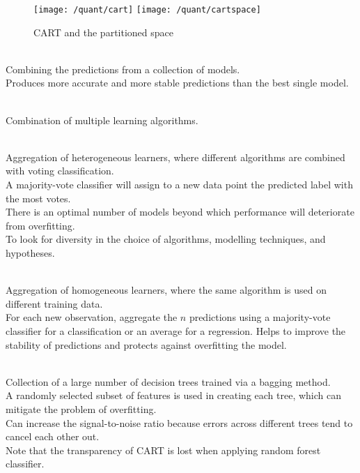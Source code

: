 \begin{figure}[H]
\centering
\texttt{[image: /quant/cart]}
\texttt{[image: /quant/cartspace]}
\caption{CART and the partitioned space}
\end{figure}

\begin{definition} \\
Combining the predictions from a collection of models.\\
Produces more accurate and more stable predictions than the best single model. 
\end{definition}

\begin{definition} \\
Combination of multiple learning algorithms.
\end{definition}

\begin{definition} \\
Aggregation of heterogeneous learners, where different algorithms are combined with voting classification.\\
A majority-vote classifier will assign to a new data point the predicted label with the most votes.\\
There is an optimal number of models beyond which performance will deteriorate from overfitting.\\
To look for diversity in the choice of algorithms, modelling techniques, and hypotheses.
\end{definition}

\begin{definition} \\
Aggregation of homogeneous learners, where the same algorithm is used on different training data.\\
For each new observation, aggregate the $n$ predictions using a majority-vote classifier for a classification or an average for a regression. Helps to improve the stability of predictions and protects against overfitting the model.
\end{definition}

\begin{definition} \\
Collection of a large number of decision trees trained via a bagging method.\\
A randomly selected subset of features is used in creating each tree, which can mitigate the problem of overfitting.\\
Can increase the signal-to-noise ratio because errors across different trees tend to cancel each other out.\\
Note that the transparency of CART is lost when applying random forest classifier.
\end{definition}

